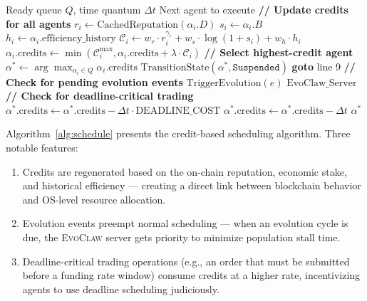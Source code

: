 \documentclass{article}
\newcommand{\evoclaw}{\textsc{EvoClaw}}
\begin{document}
\begin{algorithm}[t]
\caption{Credit-Based Agent Scheduling}
\label{alg:schedule}
\begin{algorithmic}[1]
\REQUIRE Ready queue $Q$, time quantum $\Delta t$
\ENSURE Next agent to execute
\STATE \textbf{// Update credits for all agents}
    \STATE $r_i \leftarrow \text{CachedReputation}(\alpha_i.D)$
    \STATE $s_i \leftarrow \alpha_i.B$
    \STATE $h_i \leftarrow \alpha_i.\text{efficiency\_history}$
    \STATE $\mathcal{C}_i \leftarrow w_r \cdot r_i^{\gamma_r} + w_s \cdot \log(1 + s_i) + w_h \cdot h_i$
    \STATE $\alpha_i.\text{credits} \leftarrow \min(\mathcal{C}_i^{\max}, \alpha_i.\text{credits} + \lambda \cdot \mathcal{C}_i)$
\ENDFOR
\STATE \textbf{// Select highest-credit agent}
\STATE $\alpha^* \leftarrow \arg\max_{\alpha_i \in Q} \alpha_i.\text{credits}$
    \STATE $\text{TransitionState}(\alpha^*, \texttt{Suspended})$
    \STATE \textbf{goto} line 9 
\ENDIF
\STATE \textbf{// Check for pending evolution events}
    \STATE $\text{TriggerEvolution}(e)$ 
    \RETURN $\text{EvoClaw\_Server}$
\ENDIF
\STATE \textbf{// Check for deadline-critical trading}
    \STATE $\alpha^*.\text{credits} \leftarrow \alpha^*.\text{credits} - \Delta t \cdot \text{DEADLINE\_COST}$
\ELSE
    \STATE $\alpha^*.\text{credits} \leftarrow \alpha^*.\text{credits} - \Delta t$
\ENDIF
\RETURN $\alpha^*$
\end{algorithmic}
\end{algorithm}

Algorithm~\ref{alg:schedule} presents the credit-based scheduling algorithm. Three notable features:

\begin{enumerate}[leftmargin=*]
    \item Credits are regenerated based on the on-chain reputation, economic stake, and historical efficiency — creating a direct link between blockchain behavior and OS-level resource allocation.
    \item Evolution events preempt normal scheduling — when an evolution cycle is due, the \evoclaw{} server gets priority to minimize population stall time.
    \item Deadline-critical trading operations (e.g., an order that must be submitted before a funding rate window) consume credits at a higher rate, incentivizing agents to use deadline scheduling judiciously.
\end{enumerate}
\end{document}
